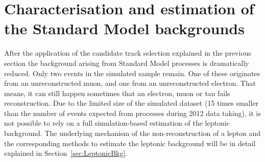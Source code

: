 \chapter{Characterisation and estimation of the Standard Model backgrounds}
\label{sec:BackgroundEstimation}
After the application of the candidate track selection explained in the previous section the background arising from Standard Model processes is dramatically reduced.
Only two events in the simulated \WJets sample remain.
One of these originates from an unreconstructed muon, and one from an unreconstructed electron.
That means, it can still happen sometimes that an electron, muon or tau fails reconstruction.
Due to the limited size of the simulated \WJets dataset (15 times smaller than the number of events expected from \WJets processes during 2012 data taking), 
it is not possible to rely on a full simulation-based estimation of the leptonic background.
The underlying mechanism of the non-reconstruction of a lepton and the corresponding methods to estimate the leptonic background will be in detail explained in Section~\ref{sec:LeptonicBkg}.

